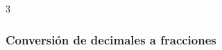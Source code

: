 {\begin{multicols}{3}
            \end{multicols}
      }

      \subsubsection{Conversión de decimales a fracciones}
   

